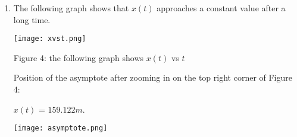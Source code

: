\documentclass[11pt]{article}
\begin{document}
\begin{enumerate}
\item The following graph shows that $x(t)$ approaches a constant value after a long time.
  \begin{center}
  \texttt{[image: xvst.png]}
  \end{center}
  \begin{center}
    Figure 4: the following graph shows $x(t)$ vs $t$
  \end{center}
  Position of the asymptote after zooming in on the top right corner of Figure 4: \\ \begin{center} $x(t)$ = $159.122m$.
  \end{center}
  \begin{center}
    \texttt{[image: asymptote.png]}
  \end{center}
  

\end{enumerate}
\end{document}
